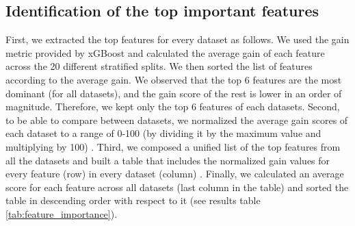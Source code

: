 \documentclass{bmcart}
\begin{document}


\subsection*{Identification of the top important features}
First, we extracted the top features for every dataset as follows. We used the gain metric provided by xGBoost and calculated the average gain of each feature across the 20 different stratified splits. We then sorted the list of features according to the average gain. We observed that the top 6 features are the most dominant (for all datasets), and the gain score of the rest is lower in an order of magnitude. Therefore, we kept only the top 6 features of each datasets.  
Second, to be able to compare between datasets, we normalized the average gain scores of each dataset to a range of 0-100 (by dividing it by the maximum value and multiplying by 100) . 
Third, we composed a unified list of the top features from all the datasets and built a table that includes the normalized gain values for every feature (row) in every dataset (column) . Finally, we calculated an average score for each feature across all datasets (last column in the table) and sorted the table in descending order with respect to it (see results table \ref{tab:feature_importance}).



\end{document}
